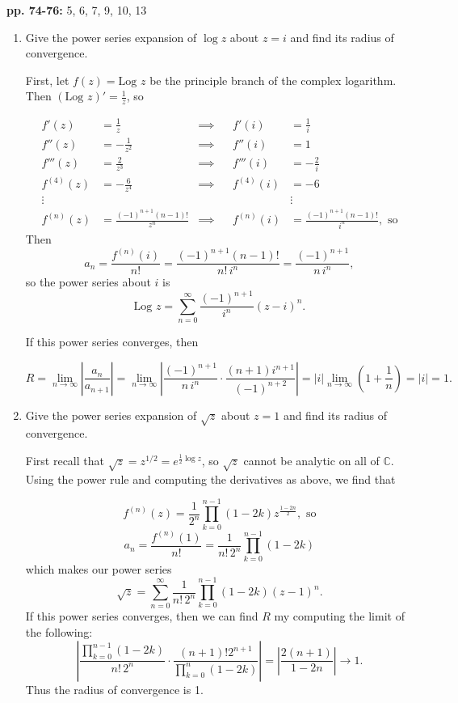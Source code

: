 \documentclass[11pt,oneside,english]{amsart}
\theoremstyle{definition}
\newcommand{\lspace}{\vspace{5mm}}
\newcommand{\lom}[2]{\lim_{{#1}\rightarrow{#2}}}
\newcommand{\Log}{\text{Log }}
\newcommand{\MB}[1]{\mathbb{#1}}
\begin{document}
\rightline{\today}

\lspace



\textbf{pp. 74-76:} 5, 6, 7, 9, 10, 13


\begin{enumerate}[leftmargin=*]
\itemsep5mm
\setcounter{enumi}{4}

\item Give the power series expansion of $\log z$ about $z=i$ and find its radius of convergence.

First, let $f(z)= \Log z$ be the principle branch of the complex logarithm. Then $(\Log z)'=\frac{1}{z}$, so

\begin{align*}
f'(z)&=\frac{1}{z} & \implies && f'(i)&=\frac{1}{i}\\[2mm]
f''(z)&=-\frac{1}{z^2} & \implies && f''(i)&=1\\[2mm]
f'''(z)&=\frac{2}{z^3} & \implies && f'''(i)&=-\frac{2}{i}\\[2mm]
f^{(4)}(z)&=-\frac{6}{z^4} & \implies && f^{(4)}(i)&=-6\\[2mm]
\vdots &  & && &\vdots\\[2mm]
f^{(n)}(z)&=\frac{(-1)^{n+1}(n-1)!}{z^{n}} & \implies && f^{(n)}(i)&=\frac{(-1)^{n+1}(n-1)!}{i^n},\text{ so}
\end{align*}
Then
\[
a_n=\frac{f^{(n)}(i)}{n!}=\frac{(-1)^{n+1}(n-1)!}{n! \,i^n}=\frac{(-1)^{n+1}}{n\,i^n},
\]
so the power series about $i$ is
\[
\Log z=\sum_{n=0}^\infty\frac{(-1)^{n+1}}{i^n}(z-i)^n.
\]

If this power series converges, then

\[
R=\lom{n}{\infty}\left|\frac{a_n}{a_{n+1}}\right|=\lom{n}{\infty}\left|\frac{(-1)^{n+1}}{n\,i^n}\cdot\frac{(n+1)i^{n+1}}{(-1)^{n+2}}\right|=|i|\lom{n}{\infty}\left(1+\frac{1}{n}\right)=|i|=1.
\]

\pagebreak

\item Give the power series expansion of $\sqrt{z}$ about $z=1$ and find its radius of convergence. 

First recall that $\sqrt{z}=z^{1/2}=e^{\frac{1}{2}\log z}$, so $\sqrt{z}$ cannot be analytic on all of $\MB{C}$. Using the power rule and computing the derivatives as above, we find that

\[
f^{(n)}(z)=\frac{1}{2^n}\prod_{k=0}^{n-1}(1-2k)z^{\frac{1-2n}{2}},\text{ so}
\]
\[
a_n=\frac{f^{(n)}(1)}{n!}=\frac{1}{n!\,2^n}\prod_{k=0}^{n-1}(1-2k)
\]
which makes our power series
\[
\sqrt{z}=\sum_{n=0}^\infty\frac{1}{n!\,2^n}\prod_{k=0}^{n-1}(1-2k)(z-1)^n.
\]
If this power series converges, then we can find $R$ my computing the limit of the following:
\[
\left|\frac{\prod_{k=0}^{n-1}(1-2k)}{n!\,2^n}\cdot\frac{(n+1)!2^{n+1}}{\prod_{k=0}^{n}(1-2k)}\right|=\left|\frac{2(n+1)}{1-2n}\right|\to 1.
\]
Thus the radius of convergence is 1.


\end{enumerate}
\end{document}
